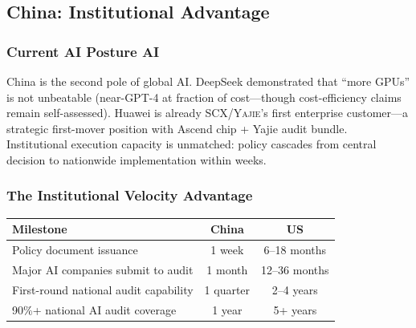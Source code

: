 \documentclass[11pt,a4paper]{article}
\theoremstyle{definition}
\theoremstyle{remark}
\newcommand{\SCX}{\textsc{SCX}}
\newcommand{\Yajie}{\textsc{Yajie}}
\begin{document}
\subsection{China: Institutional Advantage}
\label{sec:china}
\subsubsection{Current AI Posture AI}
China is the second pole of global AI. DeepSeek demonstrated that ``more GPUs'' is not unbeatable (near-GPT-4 at fraction of cost---though cost-efficiency claims remain self-assessed). Huawei is already \SCX/\Yajie{}'s first enterprise customer---a strategic first-mover position with Ascend chip + Yajie audit bundle. Institutional execution capacity is unmatched: policy cascades from central decision to nationwide implementation within weeks.
\subsubsection{The Institutional Velocity Advantage }
\begin{center}
\begin{tabular}{lcc}
\toprule
\textbf{Milestone } & \textbf{China } & \textbf{US } \\
\midrule
Policy document issuance  & 1 week & 6--18 months \\
Major AI companies submit to audit  & 1 month & 12--36 months \\
First-round national audit capability  & 1 quarter & 2--4 years \\
90\%+ national AI audit coverage  & 1 year & 5+ years \\
\bottomrule
\end{tabular}
\end{center}
\end{document}
